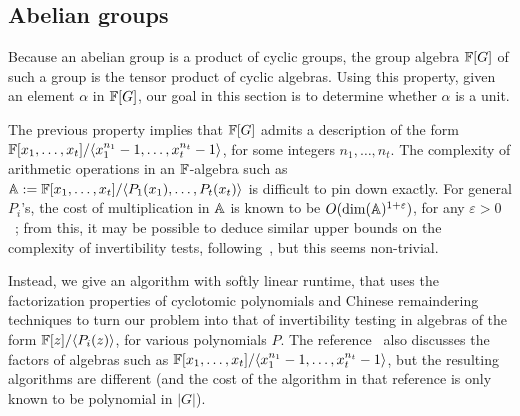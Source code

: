 
\subsection{Abelian groups}

Because an abelian group is a product of cyclic groups, the group
algebra $\mathbb{F}[G]$ of such a group is the tensor product of cyclic
algebras. Using this property, given an element $\alpha$ in $\mathbb{F}[G]$,
our goal in this section is to determine whether $\alpha$ is a unit.

The previous property implies that $\mathbb{F}[G]$ admits a description of the
form $\mathbb{F}[x_1,\dots,x_t]/\langle x_1^{n_1}-1,\dots,x_t^{n_t}-1\rangle$,
for some integers $n_1,\dots,n_t$. The complexity of arithmetic
operations in an $\mathbb{F}$-algebra such as $\mathbb{A}:=\mathbb{F}[x_1,\dots,x_t]/\langle
P_1(x_1),\dots,P_t(x_t)\rangle$ is difficult to pin down exactly. For
general $P_i$'s, the cost of multiplication in $\mathbb{A}$ is known to be
$O(\dim(\mathbb{A})^{1+\varepsilon})$, for any $\varepsilon >
0$~\cite[Theorem~2]{LiMoSc09}; from this, it may be possible to deduce
similar upper bounds on the complexity of invertibility tests,
following~\cite{DaMMMScXi06}, but this seems non-trivial.

Instead, we give an algorithm with softly linear runtime, that uses
the factorization properties of cyclotomic polynomials and Chinese
remaindering techniques to turn our problem into that of invertibility
testing in algebras of the form $\mathbb{F}[z]/\langle P_i(z) \rangle$, for
various polynomials $P$. The reference~\cite{Pol94} also discusses the
factors of algebras such as $\mathbb{F}[x_1,\dots,x_t]/\langle
x_1^{n_1}-1,\dots,x_t^{n_t}-1\rangle$, but the resulting algorithms are 
different (and the cost of the algorithm in that reference 
is only known to be polynomial in $|G|$).

\smallskip

